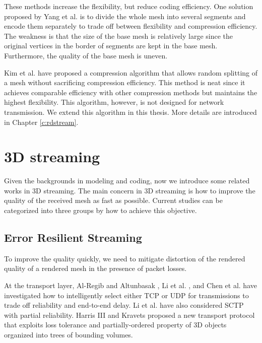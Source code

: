     These methods increase the flexibility, but reduce coding efficiency.
    One solution proposed by Yang et al. \cite{progressive:Yang}
    is to divide the whole mesh into several segments and encode them
    separately to trade off between flexibility and compression efficiency.
    The weakness is that the size of the base mesh is relatively large
    since the original vertices in the border of segments are kept in the base
    mesh. Furthermore, the quality of the base mesh is uneven.

    Kim et al. \cite{multiresolution:kim}
    have proposed a compression algorithm that allows random splitting of a mesh without
    sacrificing compression efficiency. This method is neat since it achieves comparable
    efficiency with other compression methods but maintains the highest flexibility.
    This algorithm, however, is not designed for 
	network transmission.  We extend this algorithm in this thesis. More details are introduced
    in Chapter \ref{c:rdstream}.  
    
    \section{3D streaming}
    \label{s:related:streaming}
    Given the backgrounds in modeling and coding, now we introduce some
    related works in 3D streaming. 
    The main concern in 3D streaming is how to improve the quality of the received
    mesh as fast as possible. Current studies can be categorized into three groups
    by how to achieve this objective.
    
    \subsection{Error Resilient Streaming}
    To improve the quality quickly, we need to mitigate distortion of the 
    rendered quality of a rendered mesh in the presence of packet losses.

    At the transport layer, Al-Regib and Altunbasak \cite{3tpregib}, Li
    et al. \cite{Li2006, li:3dmulticast}, and Chen et al. \cite{chen05hybrid} have
    investigated how to intelligently select either TCP or UDP for
    transmissions to trade off reliability and end-to-end delay.  Li et
    al. have also considered SCTP with partial reliability.
    Harris III and Kravets \cite{harris:design} proposed a new
    transport protocol that exploits loss tolerance and
    partially-ordered property of 3D objects organized into trees of
    bounding volumes.

